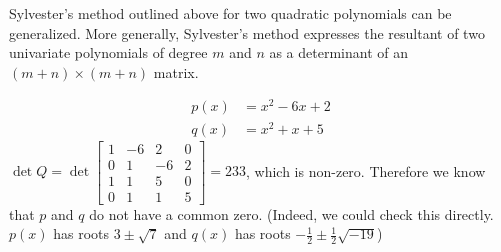 Sylvester's method outlined above for two quadratic polynomials can be
generalized. More generally, Sylvester's method expresses the
resultant of two univariate polynomials of degree $m$ and $n$ as a
determinant of an $(m+n)\times (m+n)$ matrix.

\begin{numerical-example}
  \begin{align*}
    p(x) &= x^2 - 6x + 2 \\
    q(x) &= x^2 + x + 5
  \end{align*}
  $\det Q = \det
  \begin{bmatrix}
    1 & -6 & 2 & 0 \\
    0 & 1 & -6 & 2 \\
    1 & 1 & 5 & 0 \\
    0 & 1 & 1 & 5
  \end{bmatrix} = 233
$, which is non-zero. Therefore we know that $p$ and $q$ do not have a
common zero. (Indeed, we could check this directly. $p(x)$ has roots $
3 \pm \sqrt{7}$ and $q(x)$ has roots $-\frac{1}{2} \pm \frac{1}{2}\sqrt{-19}$)
\end{numerical-example}

